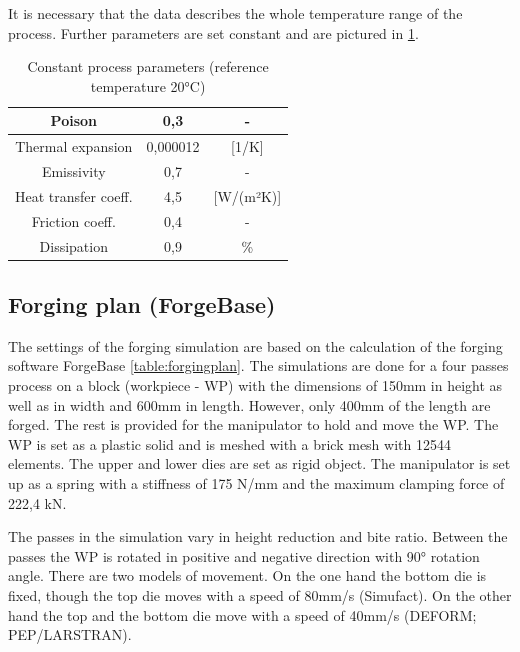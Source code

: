 It is necessary that the data describes the whole temperature range of the process. Further parameters are set constant and are pictured in \ref{table:processparameter}. 

\begin{table}[htbp]%
 \centering
 \caption{Constant process parameters (reference temperature 20°C)}
 \begin{tabular}{|c|c|c|}
 \hline
 Poison&0,3&-\\
 \hline
 Thermal expansion&0,000012&[1/K]\\
 \hline
 Emissivity&0,7&-\\
 \hline
 Heat transfer coeff.&4,5&[W/(m²K)]\\
 \hline
 Friction coeff.&0,4&-\\
 \hline
 Dissipation&0,9&\%\\
 \hline
 \end{tabular}
 \label{table:processparameter}
\end{table}

\subsection{Forging plan (ForgeBase)}
The settings of the forging simulation are based on the calculation of the forging software ForgeBase \ref{table:forgingplan}. The simulations are done for a four passes process on a block (workpiece - WP) with the dimensions of 150mm in height as well as in width and 600mm in length. However, only 400mm of the length are forged. The rest is provided for the manipulator to hold and move the WP. The WP is set as a plastic solid and is meshed with a brick mesh with 12544 elements. The upper and lower dies are set as rigid object. The manipulator is set up as a spring with a stiffness of 175 N/mm and the maximum clamping force of 222,4 kN.\par 

The passes in the simulation vary in height reduction and bite ratio. Between the passes the WP is rotated in positive and negative direction with 90° rotation angle. There are two models of movement. On the one hand the bottom die is fixed, though the top die moves with a speed of 80mm/s (Simufact). On the other hand the top and the bottom die move with a speed of 40mm/s (DEFORM; PEP/LARSTRAN).

